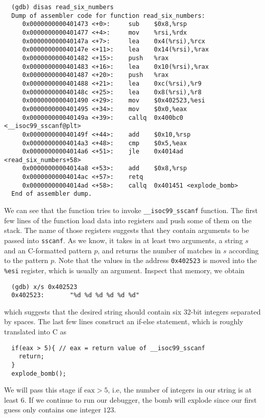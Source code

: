\begin{verbatim}
  (gdb) disas read_six_numbers
  Dump of assembler code for function read_six_numbers:
     0x0000000000401473 <+0>:     sub    $0x8,%rsp
     0x0000000000401477 <+4>:     mov    %rsi,%rdx
     0x000000000040147a <+7>:     lea    0x4(%rsi),%rcx
     0x000000000040147e <+11>:    lea    0x14(%rsi),%rax
     0x0000000000401482 <+15>:    push   %rax
     0x0000000000401483 <+16>:    lea    0x10(%rsi),%rax
     0x0000000000401487 <+20>:    push   %rax
     0x0000000000401488 <+21>:    lea    0xc(%rsi),%r9
     0x000000000040148c <+25>:    lea    0x8(%rsi),%r8
     0x0000000000401490 <+29>:    mov    $0x402523,%esi
     0x0000000000401495 <+34>:    mov    $0x0,%eax
     0x000000000040149a <+39>:    callq  0x400bc0 <__isoc99_sscanf@plt>
     0x000000000040149f <+44>:    add    $0x10,%rsp
     0x00000000004014a3 <+48>:    cmp    $0x5,%eax
     0x00000000004014a6 <+51>:    jle    0x4014ad <read_six_numbers+58>
     0x00000000004014a8 <+53>:    add    $0x8,%rsp
     0x00000000004014ac <+57>:    retq
     0x00000000004014ad <+58>:    callq  0x401451 <explode_bomb>
  End of assembler dump.
\end{verbatim}
We can see that the function tries to invoke \verb+__isoc99_sscanf+ function. The first few lines of the function load data into registers and push some of them on the stack. The name of those registers suggests that they contain arguments to be passed into \verb+sscanf+. As we know, it takes in at least two arguments, a string $s$ and an C-formatted pattern $p$, and returns the number of matches in $s$ according to the pattern $p$. Note that the values in the address \verb+0x402523+ is moved into the \verb+%esi+ register, which is usually an argument. Inspect that memory, we obtain
\begin{verbatim}
  (gdb) x/s 0x402523
  0x402523:       "%d %d %d %d %d %d"
\end{verbatim}
which suggests that the desired string should contain six 32-bit integers separated by spaces. The last few lines construct an if-else statement, which is roughly translated into C as
\begin{verbatim}
  if(eax > 5){ // eax = return value of __isoc99_sscanf
    return;
  }
  explode_bomb();
\end{verbatim}
We will pass this stage if $\text{eax} > 5$, i.e, the number of integers in our string is at least 6. If we continue to run our debugger, the bomb will explode since our first guess only contains one integer $123$.\\
